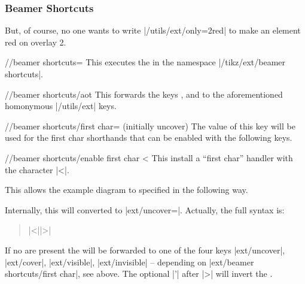 \begin{multicols*}{2}
\subsubsection{Beamer Shortcuts}
But, of course, no one wants to write |/utils/ext/only={2}{red}| to
make an element red on overlay 2.
\begin{key}{/\tikzext/beamer shortcuts=}
  This executes the  in the namespace |/tikz/ext/beamer shortcuts|.
\end{key}
\begin{key}{/\tikzext/beamer shortcuts/aot}
  This forwards the keys , 
  and  to the aforementioned homonymous |/utils/ext| keys.
\end{key}
\begin{key}{/\tikzext/beamer shortcuts/first char= (initially uncover)}
  The value of this key will be used for the first char shorthands that can be enabled with the following keys.
\end{key}
\begin{key}{/\tikzext/beamer shortcuts/enable first char <}
  This install a \enquote{first char} handler with the character |<|.
  
  This allows the example diagram to specified in the following way.
\begin{codeexample}[preamble=\usetikzlibrary{ext.beamer} \setbeamercovered{transparent},code only]
\end{codeexample}

  Internally, this will converted to |ext/uncover=|.
  Actually, the full syntax is:
  \begin{quote}
      |<||>|
  \end{quote}
  
  If no  are present the  will
  be forwarded to one of the four keys |ext/uncover|, |ext/cover|, |ext/visible|, |ext/invisible|
  -- depending on |ext/beamer shortcuts/first char|, see above.
  The optional |'| after |>| will invert the .
  

\end{key}
\end{multicols*}
